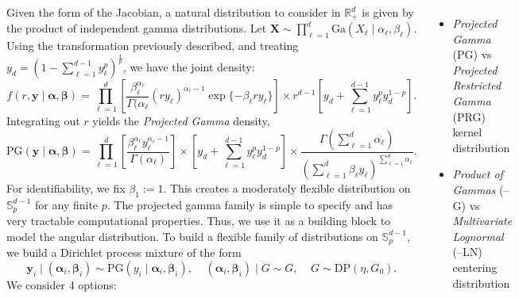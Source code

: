 \documentclass[20pt, a0paper, landscape, colspace=9mm, subcolspace=4mm, blockverticalspace=9mm, innermargin=8mm, margin=0mm]{tikzposter}
\begin{document}
\begin{columns}
    {
    Given the form of the Jacobian, a natural distribution to consider in $\mathbb{R}_+^d$ is given by the product of 
    independent gamma distributions.  Let $\bm{X} \sim \prod_{\ell = 1}^d\text{Ga}(X_{\ell}\mid\alpha_{\ell},\beta_{\ell})$.  
    Using the transformation previously described, and treating $y_d = \left(1 - \sum_{\ell = 1}^{d-1}y_{\ell}^p\right)^{\frac{1}{p}}$, we have the joint density:
    \[
        f(r,\bm{y}\mid\bm{\alpha},\bm{\beta}) = \prod_{\ell = 1}^d \left[ \frac{\beta_{\ell}^{\alpha_{\ell}}}{\Gamma(\alpha_{\ell}}
            (ry_{\ell})^{\alpha_{\ell} - 1}\exp\lbrace-\beta_{\ell}ry_{\ell}\rbrace\right]\times 
            r^{d-1}\left[y_d +
            \sum_{\ell = 1}^{d-1}y_{\ell}^py_d^{1-p}\right].
    \]
    Integrating out $r$ yields the \emph{Projected Gamma} density,
    \[
    \text{PG}\left(\bm{y}\mid\bm{\alpha},\bm{\beta}\right) = \prod_{\ell = 1}^d
        \left[\frac{\beta_{\ell}^{\alpha_{\ell}}y_{\ell}^{\alpha_{\ell} - 1}}{\Gamma(\alpha_{\ell})}\right]
        \times \left[y_d +
            \sum_{\ell = 1}^{d-1}y_{\ell}^py_d^{1-p}\right]
        \times 
        \frac{\Gamma\left(\sum_{\ell = 1}^d\alpha_{\ell}\right)}{\left(\sum_{\ell = 1}^d
                \beta_{\ell}y_{\ell}\right)^{\sum_{\ell = 1}^d\alpha_{\ell}}}.
    \]
    For identifiability, we fix $\beta_1 := 1$. This creates a moderately flexible distribution on
    $\mathbb{S}_p^{d-1}$ for any finite $p$. The projected gamma family is simple to specify and
    has very tractable computational properties. Thus, we use it as a building block to model the 
    angular distribution.  To build a flexible family of distributions on $\mathbb{S}_p^{d-1}$, we build a Dirichlet process mixture of the form
    \[
    \bm{y}_i\mid (\bm{\alpha}_i,\bm{\beta}_i) \sim \text{PG}(y_i\mid\bm{\alpha}_i,\bm{\beta}_i), \;\;\;\;
    (\bm{\alpha}_i,\bm{\beta}_i) \mid G \sim G, \;\;\;\; G \sim \text{DP}(\eta,G_0).
    \]
    We consider 4 options:
    \begin{itemize}
        \item \emph{Projected Gamma} (PG) vs \emph{Projected Restricted Gamma} (PRG) kernel distribution
        \item \emph{Product of Gammas} (--G) vs \emph{Multivariate Lognormal} (--LN) centering distribution
    \end{itemize}
    }


\end{columns}
\end{document}
